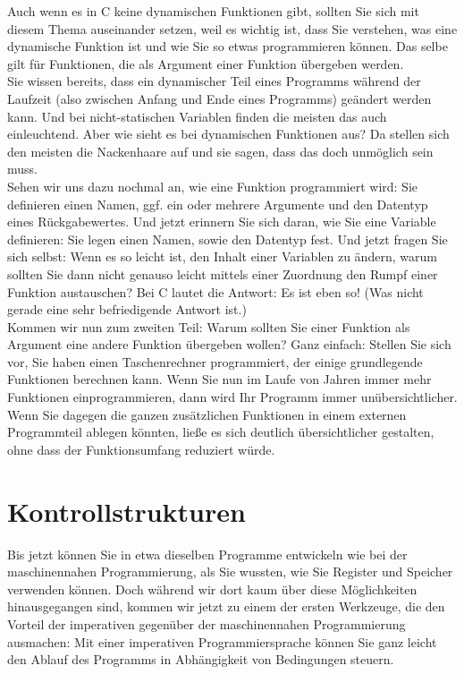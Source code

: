 Auch wenn es in C keine dynamischen Funktionen gibt, sollten Sie sich mit diesem Thema auseinander setzen, weil es wichtig ist, dass Sie verstehen, was eine dynamische Funktion ist und wie Sie so etwas programmieren können. Das selbe gilt für Funktionen, die als Argument einer Funktion übergeben werden.\\

Sie wissen bereits, dass ein dynamischer Teil eines Programms während der Laufzeit (also zwischen Anfang und Ende eines Programms) geändert werden kann. Und bei nicht-statischen Variablen finden die meisten das auch einleuchtend. Aber wie sieht es bei dynamischen Funktionen aus? Da stellen sich den meisten die Nackenhaare auf und sie sagen, dass das doch unmöglich sein muss.\\

Sehen wir uns dazu nochmal an, wie eine Funktion programmiert wird: Sie definieren einen Namen, ggf. ein oder mehrere Argumente und den Datentyp eines Rückgabewertes. Und jetzt erinnern Sie sich daran, wie Sie eine Variable definieren: Sie legen einen Namen, sowie den Datentyp fest. Und jetzt fragen Sie sich selbst: Wenn es so leicht ist, den Inhalt einer Variablen zu ändern, warum sollten Sie dann nicht genauso leicht mittels einer Zuordnung den Rumpf einer Funktion austauschen? Bei C lautet die Antwort: Es ist eben so! (Was nicht gerade eine sehr befriedigende Antwort ist.)\\

Kommen wir nun zum zweiten Teil: Warum sollten Sie einer Funktion als Argument eine andere Funktion übergeben wollen? Ganz einfach: Stellen Sie sich vor, Sie haben einen Taschenrechner programmiert, der einige grundlegende Funktionen berechnen kann. Wenn Sie nun im Laufe von Jahren immer mehr Funktionen einprogrammieren, dann wird Ihr Programm immer unübersichtlicher. Wenn Sie dagegen die ganzen zusätzlichen Funktionen in einem externen Programmteil ablegen könnten, ließe es sich deutlich übersichtlicher gestalten, ohne dass der Funktionsumfang reduziert würde.

\section{Kontrollstrukturen}

Bis jetzt können Sie in etwa dieselben Programme entwickeln wie bei der maschinennahen Programmierung, als Sie wussten, wie Sie Register und Speicher verwenden können. Doch während wir dort kaum über diese Möglichkeiten hinausgegangen sind, kommen wir jetzt zu einem der ersten Werkzeuge, die den Vorteil der imperativen gegenüber der maschinennahen Programmierung ausmachen: Mit einer imperativen Programmiersprache können Sie ganz leicht den Ablauf des Programms in Abhängigkeit von Bedingungen steuern.\\

